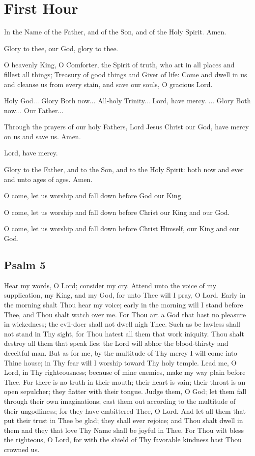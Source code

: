 \section{First Hour}

In the Name of the Father, and of the Son, and of the Holy Spirit. Amen.

Glory to thee, our God, glory to thee.

O heavenly King, O Comforter, the Spirit of truth, who art in all places and fillest all things; Treasury of good things and Giver of life: Come and dwell in us and cleanse us from every stain, and save our souls, O gracious Lord.

Holy God... Glory  Both now... All-holy Trinity... Lord, have mercy. ... Glory  Both now... Our Father...

Through the prayers of our holy Fathers, Lord Jesus Christ our God, have mercy on us and save us. Amen.

Lord, have mercy. 

Glory to the Father, and to the Son, and to the Holy Spirit: both now and ever and unto ages of ages. Amen.

O come, let us worship and fall down before God our King. 

O come, let us worship and fall down before Christ our King and our God. 

O come, let us worship and fall down before Christ Himself, our King and our God. 

\subsection{Psalm 5}

Hear my words, O Lord; consider my cry. Attend unto the voice of my supplication, my King, and my God, for unto Thee will I pray, O Lord. Early in the morning shalt Thou hear my voice; early in the morning will I stand before Thee, and Thou shalt watch over me. For Thou art a God that hast no pleasure in wickedness; the evil-doer shall not dwell nigh Thee. Such as be lawless shall not stand in Thy sight, for Thou hatest all them that work iniquity. Thou shalt destroy all them that speak lies; the Lord will abhor the blood-thirsty and deceitful man. But as for me, by the multitude of Thy mercy I will come into Thine house; in Thy fear will I worship toward Thy holy temple. Lead me, O Lord, in Thy righteousness; because of mine enemies, make my way plain before Thee. For there is no truth in their mouth; their heart is vain; their throat is an open sepulcher; they flatter with their tongue. Judge them, O God; let them fall through their own imaginations; cast them out according to the multitude of their ungodliness; for they have embittered Thee, O Lord. And let all them that put their trust in Thee be glad; they shall ever rejoice; and Thou shalt dwell in them and they that love Thy Name shall be joyful in Thee. For Thou wilt bless the righteous, O Lord, for with the shield of Thy favorable kindness hast Thou crowned us.

